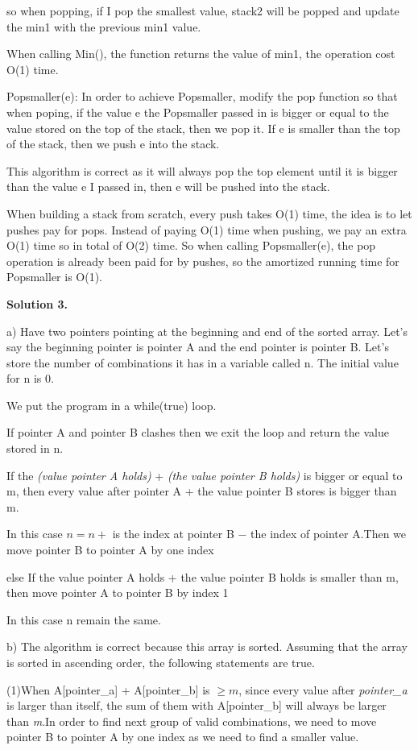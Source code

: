 \documentclass[12pt]{article}
\newcommand{\solution}[1]{\noindent \textbf{Solution #1.}}
\begin{document}
so when popping, if I pop the smallest value, stack2 will be popped and update the min1 with the previous min1 value.

When calling Min(), the function returns the value of min1, the operation cost O(1) time.

Popsmaller(e): In order to achieve Popsmaller, modify the pop function so that when poping, if the value e the Popsmaller passed in is bigger or equal to the value stored on the top of the stack, 
then we pop it. If e is smaller than the top of the stack, then we push e into the stack. 

This algorithm is correct as it will always pop the top element until it is bigger than the value e I passed in, then e will be pushed into the stack.

When building a stack from scratch, every push takes O(1) time, the idea is to let pushes pay for pops. Instead of paying O(1) time when pushing,
we pay an extra O(1) time so in total of O(2) time. So when calling Popsmaller(e), the pop operation is already been paid for by pushes, so the amortized running time
for Popsmaller is O(1).

\solution{3} 

a) 
Have two pointers pointing at the beginning and end of the sorted array. Let's say the beginning pointer is pointer A and the end pointer is pointer B. 
Let's store the number of combinations it has in a variable called n. The initial value for n is 0.

We put the program in a while(true) loop.

If pointer A and pointer B clashes then we exit the loop and return the value stored in n.

If the \textit{(value pointer A holds)} + \textit{(the value pointer B holds)} is bigger or equal to m, then every value after pointer A + the value pointer B stores is bigger than m. 

In this case \(n = n+\) is the index at pointer B \(-\) the index of pointer A.Then we move pointer B to pointer A by one index

else If the value pointer A holds + the value pointer B holds is smaller than m, then move pointer A to pointer B by index 1

In this case n remain the same.

b) 
The algorithm is correct because this array is sorted. Assuming that the array is sorted in ascending order, the following statements are true.

(1)When A[pointer\_a] + A[pointer\_b] is \begin{math}\ge m\end{math}, since every value after \textit{pointer\_a} is larger than itself, the sum of them with A[pointer\_b] will always be larger than \textit{m}.In order to find next group of valid combinations, we need to move pointer B to pointer A by one index as we need to find a smaller value.
\end{document}

